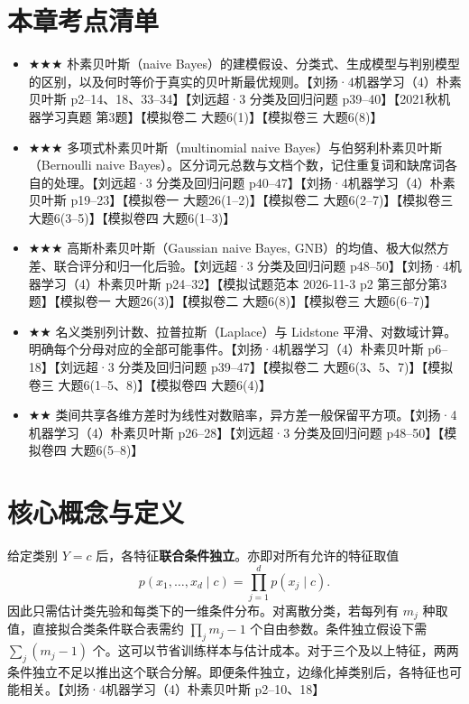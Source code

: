 \documentclass[UTF8,a4paper,zihao=-4,fontset=fandol]{ctexrep}
\begin{document}
\section{本章考点清单}
\begin{itemize}
\item \ensuremath{\bigstar\bigstar\bigstar} 朴素贝叶斯（naive Bayes）的建模假设、分类式、生成模型与判别模型的区别，以及何时等价于真实的贝叶斯最优规则。【刘扬·4机器学习（4）朴素贝叶斯 p2–14、18、33–34】【刘远超·3 分类及回归问题 p39–40】【2021秋机器学习真题 第3题】【模拟卷二 大题6(1)】【模拟卷三 大题6(8)】
\item \ensuremath{\bigstar\bigstar\bigstar} 多项式朴素贝叶斯（multinomial naive Bayes）与伯努利朴素贝叶斯（Bernoulli naive Bayes）。区分词元总数与文档个数，记住重复词和缺席词各自的处理。【刘远超·3 分类及回归问题 p40–47】【刘扬·4机器学习（4）朴素贝叶斯 p19–23】【模拟卷一 大题26(1–2)】【模拟卷二 大题6(2–7)】【模拟卷三 大题6(3–5)】【模拟卷四 大题6(1–3)】
\item \ensuremath{\bigstar\bigstar\bigstar} 高斯朴素贝叶斯（Gaussian naive Bayes, GNB）的均值、极大似然方差、联合评分和归一化后验。【刘远超·3 分类及回归问题 p48–50】【刘扬·4机器学习（4）朴素贝叶斯 p24–32】【模拟试题范本 2026-11-3 p2 第三部分第3题】【模拟卷一 大题26(3)】【模拟卷二 大题6(8)】【模拟卷三 大题6(6–7)】
\item \ensuremath{\bigstar\bigstar} 名义类别列计数、拉普拉斯（Laplace）与 Lidstone 平滑、对数域计算。明确每个分母对应的全部可能事件。【刘扬·4机器学习（4）朴素贝叶斯 p6–18】【刘远超·3 分类及回归问题 p39–47】【模拟卷二 大题6(3、5、7)】【模拟卷三 大题6(1–5、8)】【模拟卷四 大题6(4)】
\item \ensuremath{\bigstar\bigstar} 类间共享各维方差时为线性对数赔率，异方差一般保留平方项。【刘扬·4机器学习（4）朴素贝叶斯 p26–28】【刘远超·3 分类及回归问题 p48–50】【模拟卷四 大题6(5–8)】
\end{itemize}

\section{核心概念与定义}
给定类别 $Y=c$ 后，各特征\textbf{联合条件独立}。亦即对所有允许的特征取值
\[
 p(x_1,\ldots,x_d\mid c)=\prod_{j=1}^{d}p(x_j\mid c).
\]
因此只需估计类先验和每类下的一维条件分布。对离散分类，若每列有 $m_j$ 种取值，直接拟合类条件联合表需约 $\prod_jm_j-1$ 个自由参数。条件独立假设下需 $\sum_j(m_j-1)$ 个。这可以节省训练样本与估计成本。对于三个及以上特征，两两条件独立不足以推出这个联合分解。即便条件独立，边缘化掉类别后，各特征也可能相关。【刘扬·4机器学习（4）朴素贝叶斯 p2–10、18】
\end{document}
